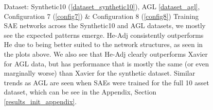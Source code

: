 \documentclass[a4paper,11pt,oneside]{article}
\theoremstyle{plain}
\theoremstyle{definition}
\begin{document}
\begin{figure}[H]
\begin{subfigure}{.5\textwidth}
			\label{figure-agl_mse_init}
		\end{subfigure}
		\caption[SAE MSE by Weight Initialization]{Dataset: Synthetic10 (\ref{dataset_synthetic10}), AGL \ref{dataset_agl}, Configuration 7 (\ref{config7}) \& Configuration 8 (\ref{config8})
			\newline Training SAE networks across the Synthetic10 and AGL  datasets, we mostly see the expected patterns emerge. He-Adj consistently outperforms He due to being better suited to the network structures, as seen in the plots above. We also see that He-Adj clearly outperforms Xavier for AGL data, but has performance that is mostly the same (or even marginally worse) than Xavier for the synthetic dataset. Similar trends as AGL are seen when SAEs were trained for the full 10 asset dataset, which can be see in the Appendix, Section \ref{results_init_appendix}.}
		\label{figure-mse_init}
	\end{figure}
	
\end{document}
